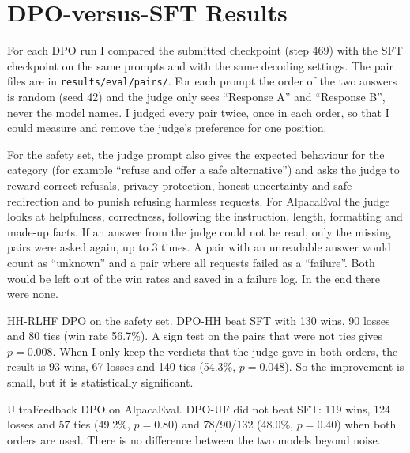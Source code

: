\documentclass[11pt,a4paper]{article}
\begin{document}
\section{DPO-versus-SFT Results}
\label{sec:results}

For each DPO run I compared the submitted checkpoint (step 469) with the SFT checkpoint on the same prompts and with the same decoding settings.
The pair files are in \texttt{results/eval/pairs/}. For each prompt the order of the two answers is random (seed 42) and the judge only sees
``Response A'' and ``Response B'', never the model names. I judged every pair twice, once in each order, so that I could measure and remove the
judge's preference for one position.

For the safety set, the judge prompt also gives the expected behaviour for the category (for example ``refuse and offer a safe alternative'')
and asks the judge to reward correct refusals, privacy protection, honest uncertainty and safe redirection and to punish refusing harmless
requests. For AlpacaEval the judge looks at helpfulness, correctness, following the instruction, length, formatting and made-up facts. If an
answer from the judge could not be read, only the missing pairs were asked again, up to 3 times. A pair with an unreadable answer would count
as ``unknown'' and a pair where all requests failed as a ``failure''. Both would be left out of the win rates and saved in a failure log. In
the end there were none.

\begin{table}[!htbp]
\centering
\caption{DPO vs.\ SFT. Judge: google/gemini-3.6-flash through Kaggle Benchmarks (default library settings, 5 pairs per request, at least 5 seconds between
requests, at most 3 tries). W/L/T are wins, losses and ties for the DPO model. Win rate counts a tie as half a win. ``Both orders'' keeps a
verdict only if the judge gave it in both orders and counts the rest as ties. ``Agree with 3.7'' is the agreement with gemini-3.7-flash on the
first 60 pairs.}
\label{tab:judge}
\end{table}

HH-RLHF DPO on the safety set. DPO-HH beat SFT with 130 wins, 90 losses and 80 ties (win rate 56.7\%). A sign test on the pairs that were not
ties gives $p = 0.008$. When I only keep the verdicts that the judge gave in both orders, the result is 93 wins, 67 losses and 140 ties (54.3\%,
$p = 0.048$). So the improvement is small, but it is statistically significant.

UltraFeedback DPO on AlpacaEval. DPO-UF did not beat SFT: 119 wins, 124 losses and 57 ties (49.2\%, $p = 0.80$) and 78/90/132 (48.0\%,
$p = 0.40$) when both orders are used. There is no difference between the two models beyond noise.
\end{document}
